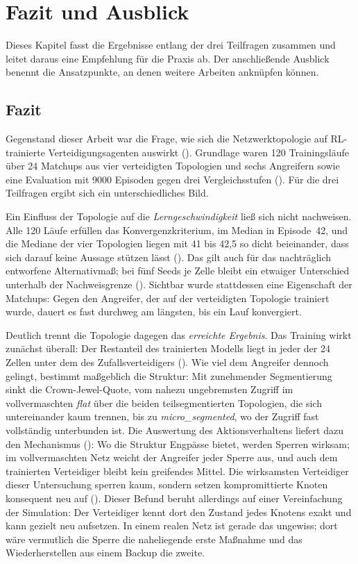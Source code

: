 \chapter{Fazit und Ausblick}
\label{ch:fazit}

Dieses Kapitel fasst die Ergebnisse entlang der drei Teilfragen zusammen
und leitet daraus eine Empfehlung für die Praxis ab. Der anschließende
Ausblick benennt die Ansatzpunkte, an denen weitere Arbeiten anknüpfen
können.

\section{Fazit}
\label{sec:fazit}

Gegenstand dieser Arbeit war die Frage, wie sich die Netzwerktopologie
auf RL-trainierte Verteidigungsagenten auswirkt (). 
Grundlage waren 120 Trainingsläufe über 24 Matchups aus
vier verteidigten Topologien und sechs Angreifern sowie eine Evaluation mit
9000 Episoden gegen drei Vergleichsstufen (). Für die drei Teilfragen ergibt sich ein unterschiedliches Bild.

Ein Einfluss der Topologie auf die \emph{Lerngeschwindigkeit} ließ
sich nicht nachweisen. Alle 120 Läufe erfüllen das Konvergenzkriterium, im Median
in Episode~42, und die Mediane der vier Topologien liegen mit 41 bis 42,5 so
dicht beieinander, dass sich darauf keine Aussage stützen lässt
(). Das gilt auch für das nachträglich
entworfene Alternativmaß; bei fünf Seeds je Zelle bleibt ein etwaiger
Unterschied unterhalb der Nachweisgrenze (). Sichtbar
wurde stattdessen eine Eigenschaft der Matchups: Gegen den
Angreifer, der auf der verteidigten Topologie trainiert wurde, dauert
es fast durchweg am längsten, bis ein Lauf konvergiert.

Deutlich trennt die Topologie dagegen das \emph{erreichte Ergebnis}. Das
Training wirkt zunächst überall: Der Restanteil des trainierten Modells
liegt in jeder der 24 Zellen unter dem des Zufallsverteidigers
(). Wie viel dem Angreifer dennoch gelingt,
bestimmt maßgeblich die Struktur: Mit zunehmender Segmentierung sinkt die
Crown-Jewel-Quote, vom nahezu ungebremsten Zugriff im vollvermaschten
\emph{flat} über die beiden teilsegmentierten Topologien, die sich
untereinander kaum trennen, bis zu \emph{micro\_segmented}, wo der Zugriff
fast vollständig unterbunden ist. Die Auswertung des Aktionsverhaltens
liefert dazu den Mechanismus (): Wo die Struktur
Engpässe bietet, werden Sperren wirksam; im vollvermaschten Netz weicht
der Angreifer jeder Sperre aus, und auch dem trainierten Verteidiger
bleibt kein greifendes Mittel. Die wirksamsten Verteidiger dieser
Untersuchung sperren kaum, sondern setzen kompromittierte
Knoten konsequent neu auf (). Dieser Befund beruht
allerdings auf einer Vereinfachung der Simulation: Der Verteidiger kennt
dort den Zustand jedes Knotens exakt und kann gezielt neu aufsetzen. In einem realen Netz
ist gerade das ungewiss; dort wäre vermutlich die Sperre die naheliegende erste Maßnahme und
das Wiederherstellen aus einem Backup die zweite.

